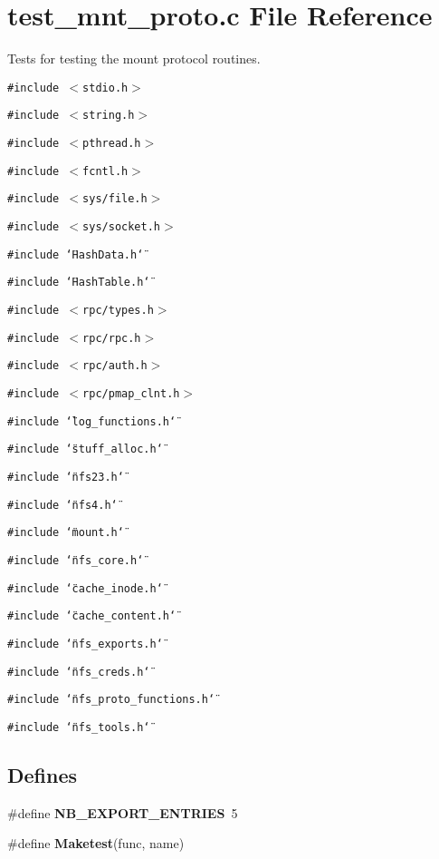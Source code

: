 \section{test\_\-mnt\_\-proto.c File Reference}
\label{test__mnt__proto_8c}
Tests for testing the mount protocol routines.  


{\tt \#include $<$stdio.h$>$}\par
{\tt \#include $<$string.h$>$}\par
{\tt \#include $<$pthread.h$>$}\par
{\tt \#include $<$fcntl.h$>$}\par
{\tt \#include $<$sys/file.h$>$}\par
{\tt \#include $<$sys/socket.h$>$}\par
{\tt \#include \char`\"{}HashData.h\char`\"{}}\par
{\tt \#include \char`\"{}HashTable.h\char`\"{}}\par
{\tt \#include $<$rpc/types.h$>$}\par
{\tt \#include $<$rpc/rpc.h$>$}\par
{\tt \#include $<$rpc/auth.h$>$}\par
{\tt \#include $<$rpc/pmap\_\-clnt.h$>$}\par
{\tt \#include \char`\"{}log\_\-functions.h\char`\"{}}\par
{\tt \#include \char`\"{}stuff\_\-alloc.h\char`\"{}}\par
{\tt \#include \char`\"{}nfs23.h\char`\"{}}\par
{\tt \#include \char`\"{}nfs4.h\char`\"{}}\par
{\tt \#include \char`\"{}mount.h\char`\"{}}\par
{\tt \#include \char`\"{}nfs\_\-core.h\char`\"{}}\par
{\tt \#include \char`\"{}cache\_\-inode.h\char`\"{}}\par
{\tt \#include \char`\"{}cache\_\-content.h\char`\"{}}\par
{\tt \#include \char`\"{}nfs\_\-exports.h\char`\"{}}\par
{\tt \#include \char`\"{}nfs\_\-creds.h\char`\"{}}\par
{\tt \#include \char`\"{}nfs\_\-proto\_\-functions.h\char`\"{}}\par
{\tt \#include \char`\"{}nfs\_\-tools.h\char`\"{}}\par
\subsection*{Defines}
\begin{CompactItemize}
\item 
\#define {\bf NB\_\-EXPORT\_\-ENTRIES}~5
\item 
\#define {\bf Maketest}(func, name)
\end{CompactItemize}
